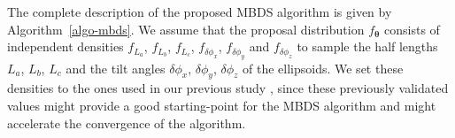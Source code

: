 \documentclass[journal]{IEEEtran}
\begin{document}





The complete description of the proposed MBDS algorithm is given by
Algorithm~\ref{algo-mbds}. We assume that the proposal distribution
$f_{\boldsymbol{\theta}}$ consists of independent densities $f_{L_a}$,
$f_{L_b}$, $f_{L_c}$, $f_{\delta{\phi_x}}$, $f_{\delta{\phi_y}}$ and
$f_{\delta{\phi_z}}$ to sample the half lengths $L_a$, $L_b$, $L_c$
and the tilt angles $\delta{\phi_x}$, $\delta{\phi_y}$,
$\delta{\phi_z}$ of the ellipsoids. We set these densities to the ones
used in our previous study \cite{li2016novel}, since these previously
validated values might provide a good starting-point for the MBDS
algorithm and might accelerate the convergence of the algorithm.
\end{document}
